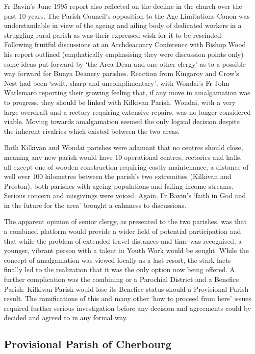Fr Bavin's June 1995 report also reflected on the decline in the church over the past 10 years. The Parish Council's opposition to the Age Limitations Canon was understandable in view of the ageing and ailing body of dedicated workers in a struggling rural parish as was their expressed wish for it to be rescinded. Following fruitful discussions at an Archdeaconry Conference with Bishop Wood his report outlined (emphatically emphasising they were discussion points only) some ideas put forward by `the Area Dean and one other clergy' as to a possible way forward for Bunya Deanery parishes. Reaction from Kingaroy and Crow's Nest had been `swift, sharp and uncomplimentary', with Wondai's Fr John Watlemaro reporting their growing feeling that, if any move in amalgamation was to progress, they should be linked with Kilkivan Parish. Wondai, with a very large overdraft and a rectory requiring extensive repairs, was no longer considered viable. Moving towards amalgamation seemed the only logical decision despite the inherent rivalries which existed between the two areas.

Both Kilkivan and Wondai parishes were adamant that no centres should close, meaning any new parish would have 10 operational centres, rectories and halls, all except one of wooden construction requiring costly maintenance, a distance of well over 100 kilometres between the parish's two extremities (Kilkivan and Proston), both parishes with ageing populations and failing income streams. Serious concern and misgivings were voiced. Again, Fr Bavin's `faith in God and in the future for the area' brought a calmness to discussions.

The apparent opinion of senior clergy, as presented to the two parishes, was that a combined platform would provide a wider field of potential participation and that while the problem of extended travel distances and time was recognised, a younger, vibrant person with a talent in Youth Work would be sought. While the concept of amalgamation was viewed locally as a last resort, the stark facts finally led to the realization that it was the only option now being offered. A further complication was the combining or a Parochial District and a Benefice Parish. Kilkivan Parish would lose its Benefice status should a Provisional Parish result. The ramifications of this and many other `how to proceed from here' issues required further serious investigation before any decision and agreements could by decided and agreed to in any formal way.

\hypertarget{provisional-parish-of-cherbourg}{%
\subsection{Provisional Parish of Cherbourg}\label{provisional-parish-of-cherbourg}}

